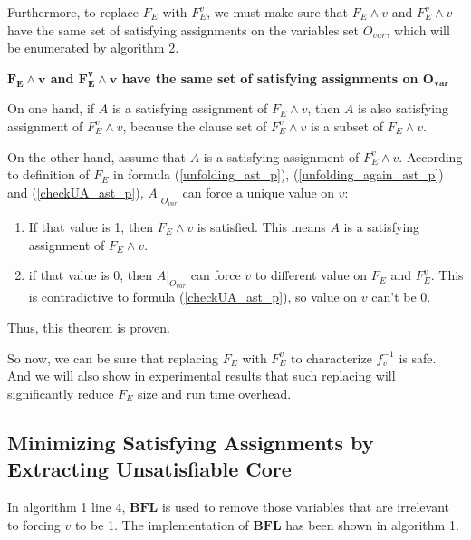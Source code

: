 \documentclass[journal]{IEEEtran}
\begin{document}
Furthermore,
to replace $F_E$ with $F_E^v$,
we must make sure that $F_E\wedge v$ and $F_E^v\wedge v$ have the same set of satisfying assignments on the variables set $O_{var}$,
which will be enumerated by algorithm 2.
\begin{theorem}[]\label{thm_fe_fev_eq}
\textbf{$\boldsymbol{F_E\wedge v}$ and $\boldsymbol{F_E^v\wedge v}$ have the same set of satisfying assignments on $\boldsymbol{O_{var}}$}
\end{theorem}
\begin{IEEEproof}
On one hand,
if $A$ is a satisfying assignment of $F_E\wedge v$,
then $A$ is also satisfying assignment of $F_E^v\wedge v$,
because the clause set of $F_E^v\wedge v$ is a subset of $F_E\wedge v$.

On the other hand,
assume that $A$ is a satisfying assignment of $F_E^v\wedge v$.
According to definition of $F_E$ in formula (\ref{unfolding_ast_p}), (\ref{unfolding_again_ast_p}) and (\ref{checkUA_ast_p}),
$A|_{O_{var}}$ can force a unique value on $v$:
\begin{enumerate}
\item If that value is 1,
then $F_E\wedge v$ is satisfied.
This means $A$ is a satisfying assignment of $F_E\wedge v$.
\item if that value is 0,
then $A|_{O_{var}}$ can force $v$ to different value on $F_E$ and $F_E^v$.
This is contradictive to formula (\ref{checkUA_ast_p}),
so value on $v$ can't be 0.
\end{enumerate}
Thus, this theorem is proven.
\end{IEEEproof}

So now,
we can be sure that replacing $F_E$ with $F_E^v$ to characterize $f^{-1}_v$ is safe.
And we will also show in experimental results that such replacing will significantly reduce $F_E$ size and run time overhead.

\subsection{Minimizing Satisfying Assignments by Extracting Unsatisfiable Core}\label{subsec_bfl}

In algorithm 1 line 4,
$\boldsymbol{BFL}$ \cite{MINASS} is used to remove those variables that are irrelevant to forcing $v$ to be 1.
The implementation of $\boldsymbol{BFL}$ has been shown in algorithm 1.
\end{document}
